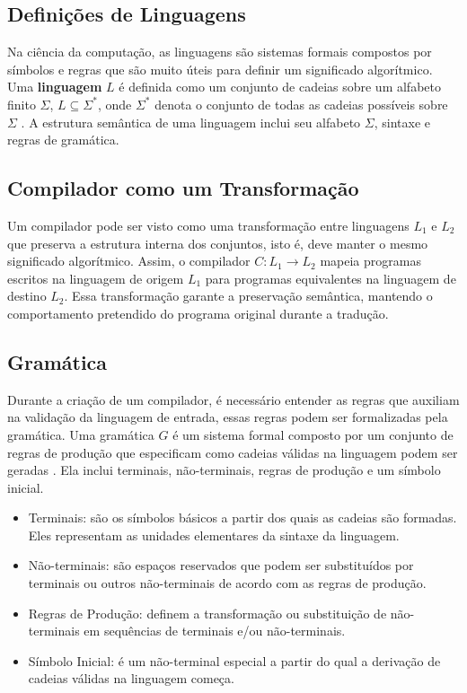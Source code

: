 \documentclass[english,
               brazil,
               bsc] %
               {dcomp-abntex2}
\begin{document}
\subsection{Definições de Linguagens} \label{linguagem}


Na ciência da computação, as linguagens são sistemas formais compostos por símbolos e regras que são muito úteis para definir um significado algorítmico. Uma \textbf{linguagem} $L$ é definida como um conjunto de cadeias sobre um alfabeto finito $ \Sigma $, $ L \subseteq \Sigma^* $, onde  $ \Sigma^* $ denota o conjunto de todas as cadeias possíveis sobre $ \Sigma $ \cite{language_theory}. A estrutura semântica de uma linguagem inclui seu alfabeto $ \Sigma $, sintaxe e regras de gramática.


\subsection{Compilador como um Transformação}


Um compilador pode ser visto como uma transformação entre linguagens $ L_1 $ e $ L_2 $ que preserva a estrutura interna dos conjuntos, isto é, deve manter o mesmo significado algorítmico. Assim, o compilador $ C: L_1 \rightarrow L_2 $ mapeia programas escritos na linguagem de origem $ L_1 $ para programas equivalentes na linguagem de destino $ L_2 $. Essa transformação garante a preservação semântica, mantendo o comportamento pretendido do programa original durante a tradução.




\subsection{Gramática} \label{gramatica}


Durante a criação de um compilador, é necessário entender as regras que auxiliam na validação da linguagem de entrada, essas regras podem ser formalizadas pela gramática. Uma gramática $G$ é um sistema formal composto por um conjunto de regras de produção que especificam como cadeias válidas na linguagem podem ser geradas \cite{language_theory}. Ela inclui terminais, não-terminais, regras de produção e um símbolo inicial.


\begin{itemize}
  \item Terminais: são os símbolos básicos a partir dos quais as cadeias são formadas. Eles representam as unidades elementares da sintaxe da linguagem.
  \item Não-terminais: são espaços reservados que podem ser substituídos por terminais ou outros não-terminais de acordo com as regras de produção.


  \item Regras de Produção: definem a transformação ou substituição de não-terminais em sequências de terminais e/ou não-terminais.


  \item Símbolo Inicial: é um não-terminal especial a partir do qual a derivação de cadeias válidas na linguagem começa.
\end{itemize}
\end{document}
